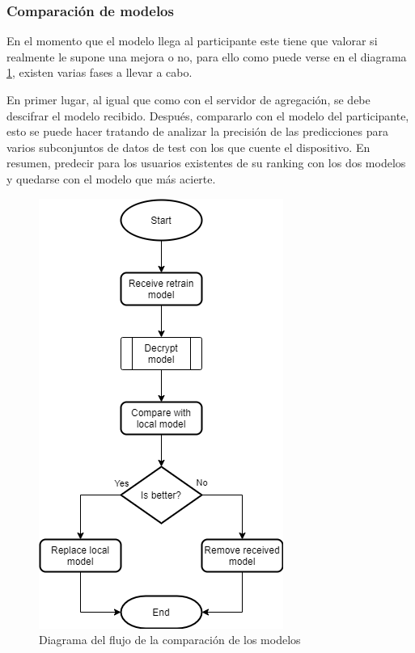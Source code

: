 \subsubsection{Comparación de modelos}
En el momento que el modelo llega al participante este tiene que valorar si realmente le supone una mejora o no, para ello como puede verse en el diagrama \ref{fig:Flow_Compare}, existen varias fases a llevar a cabo.

En primer lugar, al igual que como con el servidor de agregación, se debe descifrar el modelo recibido. Después, compararlo con el modelo del participante, esto se puede hacer tratando de analizar la precisión de las predicciones para varios subconjuntos de datos de test con los que cuente el dispositivo. En resumen, predecir para los usuarios existentes de su ranking con los dos modelos y quedarse con el modelo que más acierte.

\begin{figure}[H]
    \centering
    \includegraphics[height=0.6\textheight]{Figuras/flowchart_compare.png}    
    \caption{Diagrama del flujo de la comparación de los modelos} 
    \label{fig:Flow_Compare}
\end{figure}
